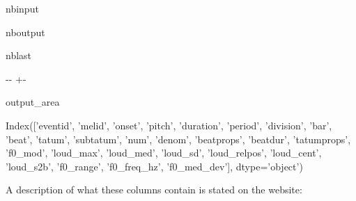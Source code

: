 \documentclass[letterpaper,10pt,english]{sphinxmanual}
\newlength\nbsphinxcodecellspacing
\begin{document}
\begin{sphinxuseclass}{nbinput}
{
\begin{sphinxVerbatim}[commandchars=\\\{\}]
\llap{\color{nbsphinxin}[21]:\,\hspace{\fboxrule}\hspace{\fboxsep}}
\end{sphinxVerbatim}
}

\end{sphinxuseclass}
\begin{sphinxuseclass}{nboutput}
\begin{sphinxuseclass}{nblast}
{

\kern-\sphinxverbatimsmallskipamount\kern-\baselineskip
\kern+\FrameHeightAdjust\kern-\fboxrule
\vspace{\nbsphinxcodecellspacing}

\begin{sphinxuseclass}{output_area}
\begin{sphinxuseclass}{}


\begin{sphinxVerbatim}[commandchars=\\\{\}]
\llap{\color{nbsphinxout}[21]:\,\hspace{\fboxrule}\hspace{\fboxsep}}Index(['eventid', 'melid', 'onset', 'pitch', 'duration', 'period', 'division',
       'bar', 'beat', 'tatum', 'subtatum', 'num', 'denom', 'beatprops',
       'beatdur', 'tatumprops', 'f0\_mod', 'loud\_max', 'loud\_med', 'loud\_sd',
       'loud\_relpos', 'loud\_cent', 'loud\_s2b', 'f0\_range', 'f0\_freq\_hz',
       'f0\_med\_dev'],
      dtype='object')
\end{sphinxVerbatim}



\end{sphinxuseclass}
\end{sphinxuseclass}
}

\end{sphinxuseclass}
\end{sphinxuseclass}
\sphinxAtStartPar
A description of what these columns contain is stated on the website: 
\end{document}
